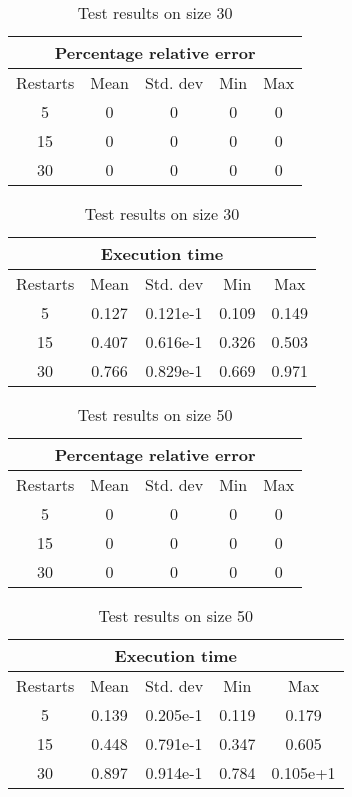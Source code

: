 \begin{table}[h]
	\caption{Test results on size 30}
	\label{tab:t30}
	\setlength\tabcolsep{4pt}
	\begin{subtable}[t]{0.35\linewidth}
		\centering
		\begin{tabular}[t]{ccccc}
			\hline
			\multicolumn{5}{c}{Percentage relative error} \\ \hline
			Restarts & Mean & Std. dev & Min & Max \\ \hline
			5        & 0    & 0        & 0   & 0   \\
			15       & 0    & 0        & 0   & 0   \\
			30       & 0    & 0        & 0   & 0  
		\end{tabular}
	\end{subtable}
	\hspace{2.5cm}
	\begin{subtable}[t]{0.42\linewidth}
		\begin{tabular}[t]{ccccc}
			\hline
			\multicolumn{5}{c}{Execution time} \\ \hline
			Restarts & Mean & Std. dev & Min & Max \\ \hline
			5 & 0.127 & 0.121e-1 & 0.109 & 0.149 \\
			15 & 0.407 & 0.616e-1 & 0.326 & 0.503 \\
			30 & 0.766 & 0.829e-1 & 0.669 & 0.971  
		\end{tabular}
	\end{subtable}
\end{table}

\begin{table}[h]
	\caption{Test results on size 50}
	\label{tab:t50}
	\setlength\tabcolsep{4pt}
	\begin{subtable}[t]{0.35\linewidth}
		\centering
		\begin{tabular}[t]{ccccc}
			\hline
			\multicolumn{5}{c}{Percentage relative error}  \\ \hline
			Restarts & Mean & Std. dev & Min & Max \\ \hline
			5        & 0    & 0        & 0   & 0   \\
			15       & 0    & 0        & 0   & 0   \\
			30       & 0    & 0        & 0   & 0  
		\end{tabular}
	\end{subtable}
	\hspace{1.8cm}
	\begin{subtable}[t]{0.42\linewidth}
		\centering
		\begin{tabular}[t]{ccccc}
			\hline
			\multicolumn{5}{c}{Execution time} \\ \hline
			Restarts & Mean & Std. dev & Min & Max \\ \hline
			5 & 0.139 & 0.205e-1 & 0.119 & 0.179 \\
			15 & 0.448 & 0.791e-1 & 0.347 & 0.605 \\
			30 & 0.897 & 0.914e-1 & 0.784 & 0.105e+1
		\end{tabular}
	\end{subtable}
\end{table}

